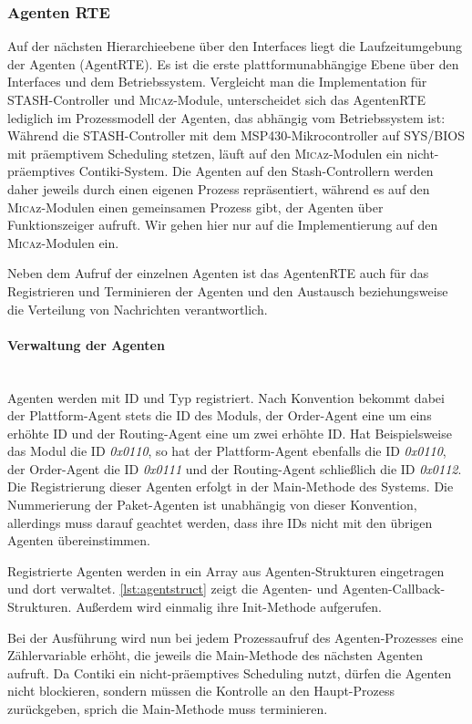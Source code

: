 \subsubsection{Agenten RTE}
\label{sec:AgentRTE}
Auf der nächsten Hierarchieebene über den Interfaces liegt die Laufzeitumgebung der Agenten (AgentRTE). Es ist die erste plattformunabhängige Ebene über den Interfaces und dem Betriebssystem. Vergleicht man die Implementation für STASH-Controller und \textsc{Mica}z-Module, unterscheidet sich das AgentenRTE lediglich im Prozessmodell der Agenten, das abhängig vom Betriebssystem ist: Während die STASH-Controller mit dem MSP430-Mikrocontroller auf SYS/BIOS mit präemptivem Scheduling stetzen, läuft auf den \textsc{Mica}z-Modulen ein nicht-präemptives Contiki-System. Die Agenten auf den Stash-Controllern werden daher jeweils durch einen eigenen Prozess repräsentiert, während es auf den \textsc{Mica}z-Modulen einen gemeinsamen Prozess gibt, der Agenten über Funktionszeiger aufruft. Wir gehen hier nur auf die Implementierung auf den \textsc{Mica}z-Modulen ein.

Neben dem Aufruf der einzelnen Agenten ist das AgentenRTE auch für das Registrieren und Terminieren der Agenten und den Austausch beziehungsweise die Verteilung von Nachrichten verantwortlich.

\paragraph{Verwaltung der Agenten}\mbox{}\\
Agenten werden mit ID und Typ registriert. Nach Konvention bekommt dabei der Plattform-Agent stets die ID des Moduls, der Order-Agent eine um eins erhöhte ID und der Routing-Agent eine um zwei erhöhte ID. Hat Beispielsweise das Modul die ID \textit{0x0110}, so hat der Plattform-Agent ebenfalls die ID \textit{0x0110}, der Order-Agent die ID \textit{0x0111} und der Routing-Agent schließlich die ID \textit{0x0112}. Die Registrierung dieser Agenten erfolgt in der Main-Methode des Systems. Die Nummerierung der Paket-Agenten ist unabhängig von dieser Konvention, allerdings muss darauf geachtet werden, dass ihre IDs nicht mit den übrigen Agenten übereinstimmen.

Registrierte Agenten werden in ein Array aus Agenten-Strukturen eingetragen und dort verwaltet.
\autoref{lst:agentstruct} zeigt die Agenten- und Agenten-Callback-Strukturen. Außerdem wird einmalig ihre Init-Methode aufgerufen.

Bei der Ausführung wird nun bei jedem Prozessaufruf des Agenten-Prozesses eine Zählervariable erhöht, die jeweils die Main-Methode des nächsten Agenten aufruft. Da  Contiki ein nicht-präemptives Scheduling nutzt, dürfen die Agenten nicht blockieren, sondern müssen die Kontrolle an den Haupt-Prozess zurückgeben, sprich die Main-Methode muss terminieren.


